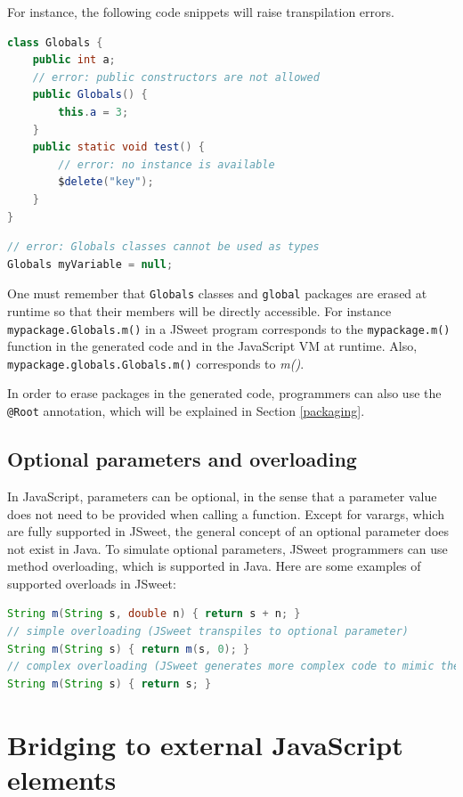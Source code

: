 \documentclass[a4paper]{report}
\begin{document}
For instance, the following code snippets will raise transpilation errors.

\begin{lstlisting}[language=Java]
class Globals {
	public int a;
	// error: public constructors are not allowed
	public Globals() {
		this.a = 3;
	}
	public static void test() {
		// error: no instance is available
		$delete("key");
	}
}
\end{lstlisting}

\begin{lstlisting}[language=Java]
// error: Globals classes cannot be used as types
Globals myVariable = null;
\end{lstlisting}

One must remember that \texttt{Globals} classes and \texttt{global} packages are erased at runtime so that their members will be directly accessible. For instance \texttt{mypackage.Globals.m()} in a JSweet program corresponds to the \texttt{mypackage.m()} function in the generated code and in the JavaScript VM at runtime. Also, \texttt{mypackage.globals.Globals.m()} corresponds to \emph{m()}.

In order to erase packages in the generated code, programmers can also use the \texttt{@Root} annotation, which will be explained in Section \ref{packaging}.

\section{Optional parameters and overloading} 
\label{optional-parameters}

In JavaScript, parameters can be optional, in the sense that a parameter value does not need to be provided when calling a function. Except for varargs, which are fully supported in JSweet, the general concept of an optional parameter does not exist in Java. To simulate optional parameters, JSweet programmers can use method overloading, which is supported in Java. Here are some examples of supported overloads in JSweet:

\begin{lstlisting}[language=Java]
String m(String s, double n) { return s + n; }
// simple overloading (JSweet transpiles to optional parameter)
String m(String s) { return m(s, 0); }
// complex overloading (JSweet generates more complex code to mimic the Java behavior)
String m(String s) { return s; }
\end{lstlisting}

\chapter{Bridging to external JavaScript elements}
\end{document}
